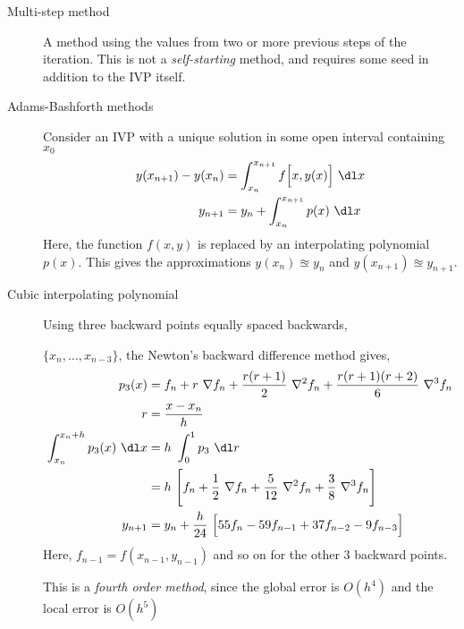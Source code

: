 \begin{description}
    \item[Multi-step method] A method using the values from two or more previous steps
        of the iteration. This is not a \emph{self-starting} method, and requires some
        seed in addition to the IVP itself.

    \item[Adams-Bashforth methods] Consider an IVP with a unique solution in some
        open interval containing $ x_0 $
        \begin{align}
            y(x_{n+1}) - y(x_n) & = \int_{x_n}^{x_{n+1}} f\Big[x, y(x)\Big]\ \dl x \\
            y_{n+1}             & = y_n + \int_{x_n}^{x_{n+1}}p(x)\ \dl x
        \end{align}
        Here, the function $ f(x, y) $ is replaced by an interpolating polynomial
        $ p(x) $. This gives the approximations $ y(x_n) \approxeq y_n $ and
        $ y(x_{n+1}) \approxeq y_{n+1} $.

    \item[Cubic interpolating polynomial] Using three backward points equally spaced
        backwards,\par
        $ \{x_n,\dots,x_{n-3}\} $, the Newton's backward difference method
        gives,
        \begin{align}
            p_3(x)                             & = f_n + r\ \nabla f_n
            + \frac{r(r+1)}{2}\ \nabla^2 f_n
            + \frac{r(r+1)(r+2)}{6}\ \nabla^3 f_n                             \\
            r                                  & = \frac{x - x_n}{h}          \\
            \int_{x_n}^{x_n + h} p_3(x)\ \dl x & = h\ \int_{0}^{1} p_3\ \dl r \\
                                               & = h\ \Bigg[ f_n
                + \frac{1}{2}\ \nabla f_n + \frac{5}{12}\ \nabla^2 f_n
            + \frac{3}{8}\ \nabla^3 f_n \Bigg]                                \\
            y_{n+1}                            & = y_n + \frac{h}{24}
            \ \Big[ 55 f_n - 59f_{n-1} +37f_{n-2} - 9f_{n-3} \Big]
        \end{align}
        Here, $ f_{n-1} = f(x_{n-1}, y_{n-1}) $ and so on for the other 3 backward
        points. \par
        This is a \emph{fourth order method}, since the global error is $ O(h^4) $ and
        the local error is $ O(h^5) $


\end{description}
